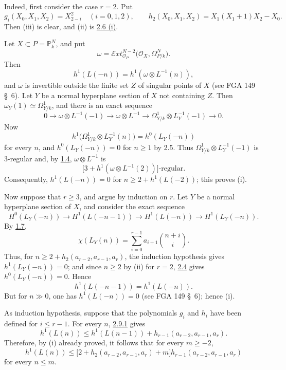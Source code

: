 Indeed, first consider the case \(r=2\). Put
\[
g_i(X_0,X_1,X_2)=X_{2-i}^2\quad(i=0,1,2),
\qquad
h_2(X_0,X_1,X_2)=X_1(X_1+1)X_2-X_0.
\]
Then (iii) is clear, and (ii) is \hyperlink{sga6.e13.lem.2-6}{2.6 (i)}.

Let \(X\subset P=\mathbb P_k^N\), and put
\[
\omega=
\mathcal E\!xt_{\mathcal O_P}^{N-2}
\bigl(\mathcal O_X,\Omega^N_{P/k}\bigr).
\]
Then
\[
h^1(L(-n))=h^1(\omega\otimes L^{-1}(n)),
\]
and \(\omega\) is invertible outside the finite set \(Z\) of singular
points of \(X\) (see FGA 149 \S~6). Let \(Y\) be a normal hyperplane
section of \(X\) not containing \(Z\). Then
\(\omega_Y(1)\simeq\Omega^1_{Y/k}\), and there is an exact sequence
\[
0\longrightarrow\omega\otimes L^{-1}(-1)
\longrightarrow\omega\otimes L^{-1}
\longrightarrow\Omega^1_{Y/k}\otimes L_Y^{-1}(-1)
\longrightarrow0.
\]
Now
\[
h^1\bigl(\Omega^1_{Y/k}\otimes L_Y^{-1}(n)\bigr)
=h^0(L_Y(-n))
\]
for every \(n\), and \(h^0(L_Y(-n))=0\) for \(n\ge1\) by 2.5. Thus
\(\Omega^1_{Y/k}\otimes L_Y^{-1}(-1)\) is 3-regular and, by \hyperlink{sga6.e13.prop.1-4}{1.4},
\(\omega\otimes L^{-1}\) is
\[
\bigl[3+h^1(\omega\otimes L^{-1}(2))\bigr]\text{-regular}.
\]
Consequently, \(h^1(L(-n))=0\) for
\(n\ge2+h^1(L(-2))\); this proves (i).

Now suppose that \(r\ge3\), and argue by induction on \(r\). Let \(Y\)
be a normal hyperplane section of \(X\), and consider the exact sequence
\begin{equation}
H^0(L_Y(-n))\longrightarrow H^1(L(-n-1))
\longrightarrow H^1(L(-n))\longrightarrow H^1(L_Y(-n)).
\tag{2.9.1}
\end{equation}
By \hyperlink{sga6.e13.lem.1-7}{1.7},
\[
\chi(L_Y(n))=
\sum_{i=0}^{r-1}a_{i+1}\binom{n+i}{i}.
\]
Thus, for \(n\ge2+h_2(a_{r-2},a_{r-1},a_r)\), the induction
hypothesis gives \(h^1(L_Y(-n))=0\); and since \(n\ge2\) by (ii) for
\(r=2\), \hyperlink{sga6.e13.lem.2-4}{2.4} gives \(h^0(L_Y(-n))=0\). Hence
\[
h^1(L(-n-1))=h^1(L(-n)).
\]
But for \(n\gg0\), one has \(h^1(L(-n))=0\) (see FGA 149 \S~6); hence
(i).

As induction hypothesis, suppose that the polynomials \(g_i\) and \(h_i\)
have been defined for \(i\le r-1\). For every \(n\), \hyperlink{sga6.e13.eq.2-9-1}{2.9.1} gives
\[
h^1(L(n))\le h^1(L(n-1))
+h_{r-1}(a_{r-2},a_{r-1},a_r).
\]
Therefore, by (i)
already proved, it follows that for every \(m\ge-2\),
\begin{equation}
h^1(L(n))\le
\bigl[2+h_2(a_{r-2},a_{r-1},a_r)+m\bigr]
h_{r-1}(a_{r-2},a_{r-1},a_r)
\tag{2.9.2}
\end{equation}
for every \(n\le m\).

